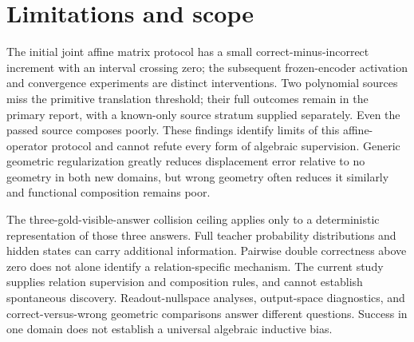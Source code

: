 \documentclass[11pt]{article}
\begin{document}
\section{Limitations and scope}
The initial joint affine matrix protocol has a small correct-minus-incorrect increment with an interval crossing zero; the subsequent frozen-encoder activation and convergence experiments are distinct interventions. Two polynomial sources miss the primitive translation threshold; their full outcomes remain in the primary report, with a known-only source stratum supplied separately. Even the passed source composes poorly. These findings identify limits of this affine-operator protocol and cannot refute every form of algebraic supervision. Generic geometric regularization greatly reduces displacement error relative to no geometry in both new domains, but wrong geometry often reduces it similarly and functional composition remains poor.

The three-gold-visible-answer collision ceiling applies only to a deterministic representation of those three answers. Full teacher probability distributions and hidden states can carry additional information. Pairwise double correctness above zero does not alone identify a relation-specific mechanism. The current study supplies relation supervision and composition rules, and cannot establish spontaneous discovery. Readout-nullspace analyses, output-space diagnostics, and correct-versus-wrong geometric comparisons answer different questions. Success in one domain does not establish a universal algebraic inductive bias.







\end{document}
